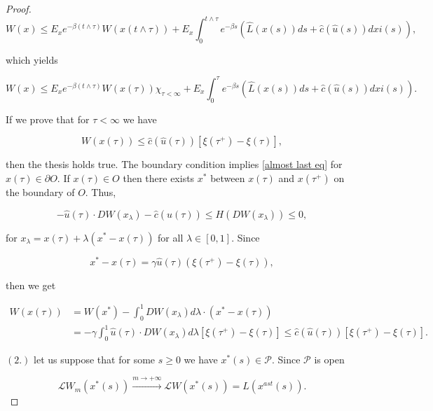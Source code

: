 \begin{theorem}
\begin{proof}
        \begin{equation*}
            W(x) \leq E_x e^{-\beta (t\land\tau)}W(x(t\land\tau)) + E_x \int_0^{t\land \tau}e^{-\beta s}(\hat{L}(x(s))ds + \hat{c}(\hat{u}(s))dxi(s)),
        \end{equation*}

        which yields 

        \begin{equation*}
            W(x) \leq E_x e^{-\beta (t\land\tau)}W(x(\tau))\chi_{\tau<\infty} + E_x \int_0^{\tau}e^{-\beta s}(\hat{L}(x(s))ds + \hat{c}(\hat{u}(s))dxi(s)).          
        \end{equation*}

        If we prove that for $\tau<\infty$ we have

        \begin{equation}\label{almost last eq}
            W(x(\tau)) \leq \hat{c}(\hat{u}(\tau))[\xi(\tau^+) - \xi(\tau)],
        \end{equation}

        then the thesis holds true. The boundary condition implies \eqref{almost last eq} for $x(\tau)\in\partial O$. If $x(\tau)\in O$ then there exists $x^{\ast}$ between $x(\tau)$ and $x(\tau^+)$ on the boundary of $O$. Thus, 

        \[-\hat{u}(\tau)\cdot DW(x_{\lambda}) - \hat{c}(\hat{u}(\tau)) \leq H(DW(x_{\lambda})) \leq 0,\]

        for $x_{\lambda} = x(\tau) + \lambda(x^{\ast} - x(\tau))$ for all $\lambda\in[0,1]$. Since 
        
        \[x^{\ast} - x(\tau) = \gamma\hat{u}(\tau)(\xi(\tau^+)-\xi(\tau)),\] 
        
        then we get 
        
        \begin{align*}
            W(x(\tau)) & = W(x^{\ast}) - \int_0^1 DW(x_{\lambda})d\lambda\cdot(x^{\ast} - x(\tau)) \\
            & = -\gamma\int_0^1\hat{u}(\tau)\cdot DW(x_{\lambda})d\lambda[\xi(\tau^+)-\xi(\tau)]\leq \hat{c}(\hat{u}(\tau))[\xi(\tau^+) - \xi(\tau)].
        \end{align*}        

        $(\textit{2}.)$ let us suppose that for some $s\geq0$ we have $x^{\ast}(s)\in\mathcal{P}$. Since $\mathcal{P}$ is open

        \[\mathcal{L}W_m(x^{\ast}(s))\xrightarrow{m\to+\infty}\mathcal{L}W(x^\ast(s))=\hat{L}(x^{ast}(s)).\]


\end{proof}
\end{theorem}
